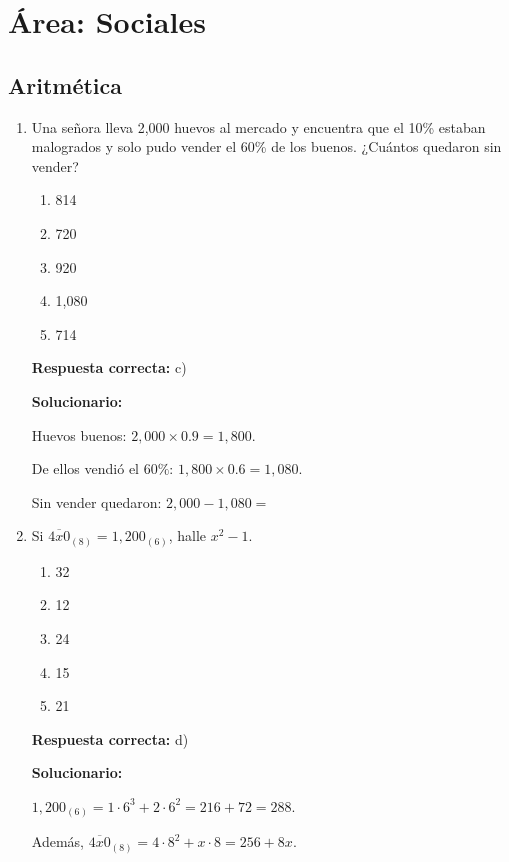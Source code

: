 \section*{Área: Sociales}


\subsection*{Aritmética}

\begin{enumerate}
	\item Una señora lleva 2,000 huevos al mercado y encuentra que el 10\% estaban malogrados y solo pudo vender el 60\% de los buenos. ¿Cuántos quedaron sin vender?
	\begin{enumerate}[label=\alph*)]
		\item 814
		\item 720
		\item 920
		\item 1,080
		\item 714
	\end{enumerate}
	\textbf{Respuesta correcta:} c)
	
	\vspace{2mm}
	\textbf{Solucionario:}
	
	Huevos buenos: $2,000\times 0.9=1,800$.
	
	De ellos vendió el $60\%$: $1,800\times 0.6=1,080$.
	
	Sin vender quedaron: $2,000-1,080=$
	
	\vspace{6mm}
	
	\item Si $\overline{4x0}_{(8)}=1,200_{(6)}$, halle $x^2-1$.
	\begin{enumerate}[label=\alph*)]
		\item 32
		\item 12
		\item 24
		\item 15
		\item 21
	\end{enumerate}
	\textbf{Respuesta correcta:} d)
	
	\vspace{2mm}
	\textbf{Solucionario:}
	
	$1,200_{(6)}=1\cdot 6^3+2\cdot 6^2=216+72=288$.
	
	Además, $\overline{4x0}_{(8)}=4\cdot 8^2+x\cdot 8=256+8x$.
	

\end{enumerate}
